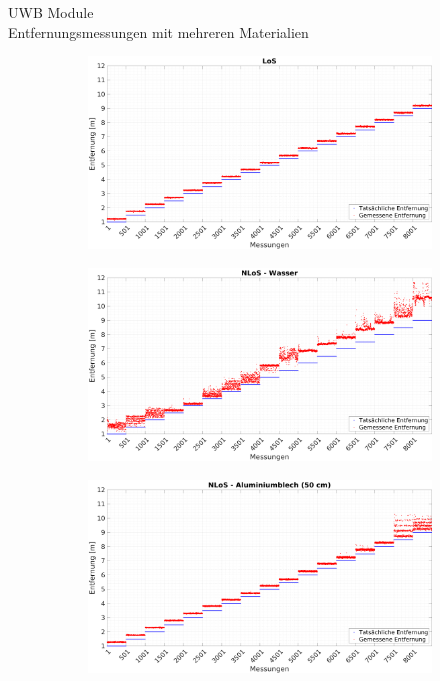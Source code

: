 \documentclass{beamer}
\begin{document}
%
%
\begin{frame}{UWB Module\\\normalsize{Entfernungsmessungen mit mehreren Materialien}}
	\begin{figure}
		\centering
		\begin{subfigure}[t]{0.47\linewidth}
			\centering
			\includegraphics[width=\linewidth]{entfernungsmessung_2018_01_20_los}
		\end{subfigure}
		\hfill
		\begin{subfigure}[t]{0.47\linewidth}
			\centering
			\includegraphics[width=\linewidth]{entfernungsmessung_2018_01_20_nlos_water}
		\end{subfigure}
		\par
		\bigskip
		\begin{subfigure}[t]{0.47\linewidth}
			\centering
			\includegraphics[width=\linewidth]{entfernungsmessung_2018_01_20_nlos_metal}

\end{subfigure}
\end{figure}
\end{frame}
\end{document}

